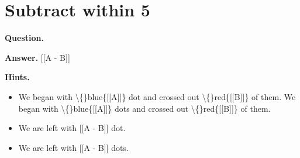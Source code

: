 \documentclass{article}
\begin{document}
\section*{Subtract within 5}
\textbf{Question.} 

\textbf{Answer.} [[A - B]]

\textbf{Hints.}
\begin{itemize}
  \item We began with \textbackslash\{\}blue\{[[A]]\} dot and crossed out \textbackslash\{\}red\{[[B]]\} of them.
                        We began with \textbackslash\{\}blue\{[[A]]\} dots and crossed out \textbackslash\{\}red\{[[B]]\} of them.
  \item We are left with [[A - B]] dot.
  \item We are left with [[A - B]] dots.
\end{itemize}
\end{document}
